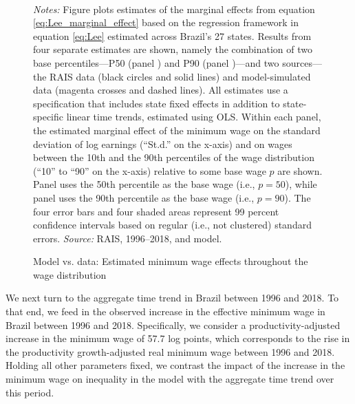 \begin{figure}[!htb]
  \centering
  \caption{Model vs. data: Estimated minimum wage effects throughout the wage distribution\label{fig: Lee data model vs data}}
  \prefigvspace
  \\
  \postfigvspace
  \begin{minipage}[t]{1\columnwidth}%
    \begin{spacing}{0.75}
      \emph{\scriptsize{}Notes: }{\scriptsize{}Figure plots estimates of the marginal effects from equation \eqref{eq:Lee_marginal_effect} based on the regression framework in equation \eqref{eq:Lee} estimated across Brazil's 27 states. Results from four separate estimates are shown, namely the combination of two base percentiles---P50 (panel ) and P90 (panel )---and two sources---the RAIS data (black circles and solid lines) and model-simulated data (magenta crosses and dashed lines). All estimates use a specification that includes state fixed effects in addition to state-specific linear time trends, estimated using OLS. Within each panel, the estimated marginal effect of the minimum wage on the standard deviation of log earnings (``St.d.'' on the x-axis) and on wages between the 10th and the 90th percentiles of the wage distribution (``10'' to ``90'' on the x-axis) relative to some base wage $p$ are shown. Panel  uses the 50th percentile as the base wage (i.e., $p=50$), while panel  uses the 90th percentile as the base wage (i.e., $p=90$). The four error bars and four shaded areas represent 99 percent confidence intervals based on regular (i.e., not clustered) standard errors.
      \emph{\scriptsize{}Source: } RAIS, 1996--2018, and model.}
    \end{spacing}
  \end{minipage}
\end{figure}


We next turn to the aggregate time trend in Brazil between 1996 and 2018. To that end, we feed in the observed increase in the effective minimum wage in Brazil between 1996 and 2018. Specifically, we consider a productivity-adjusted increase in the minimum wage of 57.7 log points, which corresponds to the rise in the productivity growth-adjusted real minimum wage between 1996 and 2018. Holding all other parameters fixed, we contrast the impact of the increase in the minimum wage on inequality in the model with the aggregate time trend over this period.

